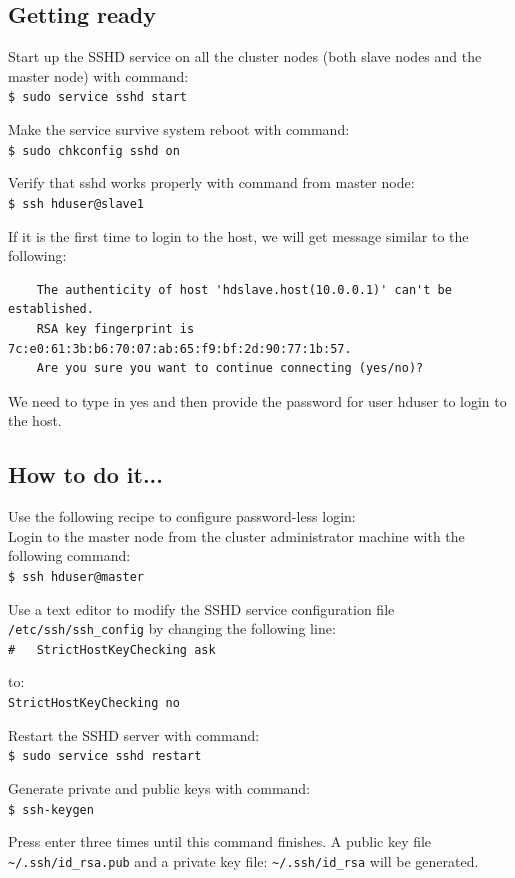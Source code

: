 \subsection*{Getting ready}
Start up the SSHD service on all the cluster nodes (both slave nodes and the master node) with command: \\
\verb|$ sudo service sshd start|

Make the service survive system reboot with command: \\
\verb|$ sudo chkconfig sshd on|

Verify that sshd works properly with command from master node: \\
\verb|$ ssh hduser@slave1|

If it is the first time to login to the host, we will get message similar to the following:
\lstset{style=bashstyle}
\begin{lstlisting}
    The authenticity of host 'hdslave.host(10.0.0.1)' can't be established.
    RSA key fingerprint is 7c:e0:61:3b:b6:70:07:ab:65:f9:bf:2d:90:77:1b:57.
    Are you sure you want to continue connecting (yes/no)?
\end{lstlisting}

We need to type in yes and then provide the password for user hduser to login to the host.
\subsection*{How to do it...}
Use the following recipe to configure password-less login: \\
Login to the master node from the cluster administrator machine with the following command: \\
\verb|$ ssh hduser@master|

Use a text editor to modify the SSHD service configuration file \verb|/etc/ssh/ssh_config| by changing the following line: \\
\verb|#   StrictHostKeyChecking ask|

to: \\
\verb|StrictHostKeyChecking no|

Restart the SSHD server with command: \\
\verb|$ sudo service sshd restart|

Generate private and public keys with command: \\
\verb|$ ssh-keygen|

Press enter three times until this command finishes. A public key file \verb|~/.ssh/id_rsa.pub| and a private key file: \verb|~/.ssh/id_rsa| will be generated.

